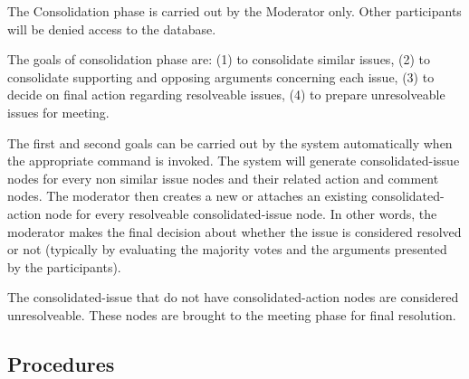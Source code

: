 The Consolidation phase is carried out by the Moderator only. Other
participants will be denied access to the database.

The goals of consolidation phase are: (1) to consolidate similar
issues, (2) to consolidate supporting and opposing arguments
concerning each issue,
(3) to decide on final action regarding resolveable issues, 
(4) to prepare
    unresolveable issues for meeting.

The first and second goals can be carried out by the system
automatically when the appropriate command is invoked.
The system will generate
consolidated-issue nodes for every non similar issue nodes and their
related action and comment nodes. The moderator then creates a new or
attaches an existing consolidated-action node for every resolveable
consolidated-issue node. In other words, the moderator makes the final
decision about whether the issue is considered resolved or not
(typically by evaluating the majority votes and the arguments
presented by the participants).  

The consolidated-issue that do not have consolidated-action
nodes are considered unresolveable. These nodes are brought to the
meeting phase for final resolution.

\subsection {Procedures}


